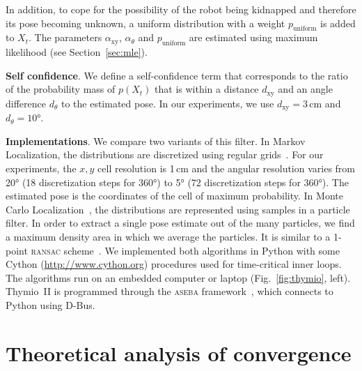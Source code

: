 \documentclass{svmult}
\newcommand{\fig}[1]{Fig.~\ref{fig:#1}}
\newcommand{\sect}[1]{Section~\ref{sec:#1}}
\begin{document}
In addition, to cope for the possibility of the robot being kidnapped and therefore its pose becoming unknown, a uniform distribution with a weight $p_\mathrm{uniform}$ is added to $X_t$.
The parameters $\alpha_\mathrm{xy}$, $\alpha_\theta$ and $p_\mathrm{uniform}$ are estimated using maximum likelihood (see \sect{mle}).


\textbf{Self confidence}. We define a self-confidence term that corresponds to the ratio of the probability mass of $p(X_t)$ that is within a distance $d_\mathrm{xy}$ and an angle difference $d_\theta$ to the estimated pose.
In our experiments, we use $d_\mathrm{xy} = 3$\,cm and $d_\theta = 10$°.


\textbf{Implementations}.
We compare two variants of this filter.
In Markov Localization, the distributions are discretized using regular grids~\cite{fox1999markov}.
For our experiments, the $x,y$ cell resolution is 1\,cm and the angular resolution varies from 20° (18 discretization steps for 360°) to 5° (72 discretization steps for 360°).
The estimated pose is the coordinates of the cell of maximum probability.
In Monte Carlo Localization~\cite{dellaert1999monte}, the distributions are represented using samples in a particle filter.
In order to extract a single pose estimate out of the many particles, we find a maximum density area in which we average the particles.
It is similar to a 1-point \textsc{ransac} scheme~\cite{Fischler1981ransac}.
We implemented both algorithms in Python with some Cython (\url{http://www.cython.org}) procedures used for time-critical inner loops.
The algorithms run on an embedded computer or laptop (\fig{thymio}, left).
Thymio~II is programmed through the \textsc{aseba} framework~\cite{aseba2011tmech}, which connects to Python using D-Bus.

\section{Theoretical analysis of convergence}
\label{sec:theoreticalconv}
\end{document}
